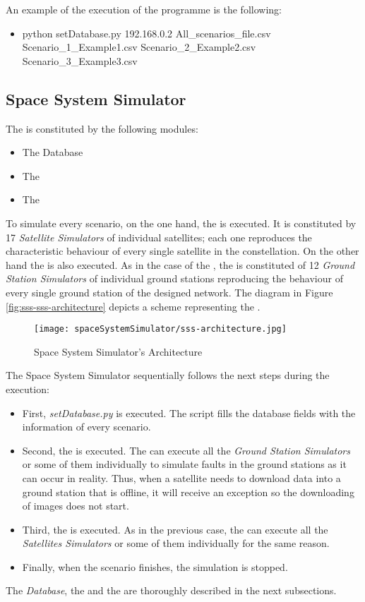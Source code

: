 An example of the execution of the programme is the following:
\begin{itemize}
\item python setDatabase.py 192.168.0.2 All\_scenarios\_file.csv Scenario\_1\_Example1.csv Scenario\_2\_Example2.csv Scenario\_3\_Example3.csv
\end{itemize}


\subsection{Space System Simulator}

The \sss is constituted by the following modules:
\begin{itemize}
\item The Database
\item The \satss
\item The \gsss
\end{itemize}


To simulate every scenario, on the one hand, the \satss is executed. It is
constituted by 17 \emph{Satellite Simulators} of individual satellites; each one
reproduces the characteristic behaviour of every single satellite in the
constellation.
On the other hand the \gsss is also executed. As in the case of the \satss, the
\gsss is constituted of 12 \emph{Ground Station Simulators} of individual ground
stations reproducing the behaviour of every single ground station of the
designed network. 
The diagram in Figure \ref{fig:sss-sss-architecture} depicts a scheme
representing the \sss.

\begin{figure}[!h]
\begin{center}
\texttt{[image: spaceSystemSimulator/sss-architecture.jpg]}
\caption{Space System Simulator's Architecture}
\label{fig:sss-architecture}
\end{center}
\end{figure}

The Space System Simulator sequentially follows the next steps during the
execution:
\begin{itemize}

\item First, \emph{setDatabase.py} is executed. The script fills the database fields with the information of every scenario.
\item Second, the \gsss is executed. The \gsss can execute all the \emph{Ground Station Simulators} or some of them individually to simulate faults in the ground stations as it can occur in reality. Thus, when a satellite needs to download data into a ground station that is offline, it will receive an exception so the downloading of images does not start.
\item Third, the \satss is executed. As in the previous case, the \satss can execute all the \emph{Satellites Simulators} or some of them individually for the same reason. 
\item Finally, when the scenario finishes, the simulation is stopped.
\end{itemize}
The \emph{Database}, the \satss and the \gsss are thoroughly described in the
next subsections. 

